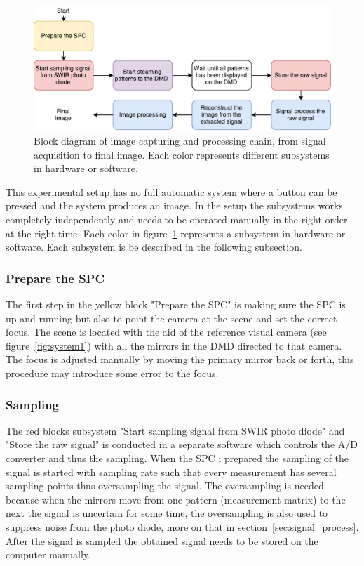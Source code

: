 \begin{figure}[H]
\includegraphics[width = 1\linewidth]{gfx/flowchart3.pdf}
\caption{Block diagram of image capturing and processing chain, from signal acquisition to final image. Each color represents different subsystems in hardware or software.}
	\label{fig:flow_chart}
\end{figure}

This experimental setup has no full automatic system where a button can be pressed and the system produces an image. In the setup the subsystems works completely independently and needs to be operated manually in the right order at the right time. Each color in figure~\ref{fig:flow_chart} represents a subsystem in hardware or software. Each subsystem is be described in the following subsection.

 
\subsubsection{Prepare the SPC}
The first step in the yellow block "Prepare the SPC" is making sure the SPC is up and running but also to point the camera at the scene and set the correct focus. The scene is located with the aid of the reference visual camera (see figure~\ref{fig:system1}) with all the mirrors in the DMD directed to that camera. The focus is adjusted manually by moving the primary mirror back or forth, this procedure may introduce some error to the focus.\\[0.1in]

\subsubsection{Sampling}
The red blocks subsystem "Start sampling signal from SWIR photo diode" and "Store the raw signal" is conducted in a separate software which controls the A/D converter and thus the sampling. When the SPC i prepared the sampling of the signal is started with sampling rate such that every measurement has several sampling points thus oversampling the signal. The oversampling is needed because when the mirrors move from one pattern (measurement matrix) to the next the signal is uncertain for some time, the oversampling is also used to suppress noise from the photo diode, more on that in section~\ref{sec:signal_process}. After the signal is sampled the obtained signal needs to be stored on the computer manually.


